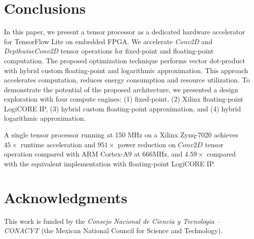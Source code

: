 \section{Conclusions}
\label{sec:conclusions}

In this paper, we present a tensor processor as a dedicated hardware accelerator for TensorFlow Lite on embedded FPGA. We accelerate \emph{Conv2D} and \emph{DepthwiseConv2D} tensor operations for fixed-point and floating-point computation. The proposed optimization technique performs vector dot-product with hybrid custom floating-point and logarithmic approximation. This approach accelerates computation, reduces energy consumption and resource utilization. To demonstrate the potential of the proposed architecture, we presented a design exploration with four compute engines: (1) fixed-point, (2) Xilinx floating-point LogiCORE IP, (3) hybrid custom floating-point approximation, and (4) hybrid logarithmic approximation.

A single tensor processor running at 150 MHz on a Xilinx Zynq-7020 achieves $45\times$ runtime acceleration and $951\times$ power reduction on $Conv2D$ tensor operation compared with ARM Cortex-A9 at 666MHz, and $4.59\times$ compared with the equivalent implementation with floating-point LogiCORE IP.

\section * {Acknowledgments}\label{sec:Ack}
This work is funded by the \textit{Consejo Nacional de Ciencia y Tecnologia -- CONACYT} (the Mexican National Council for Science and Technology).
